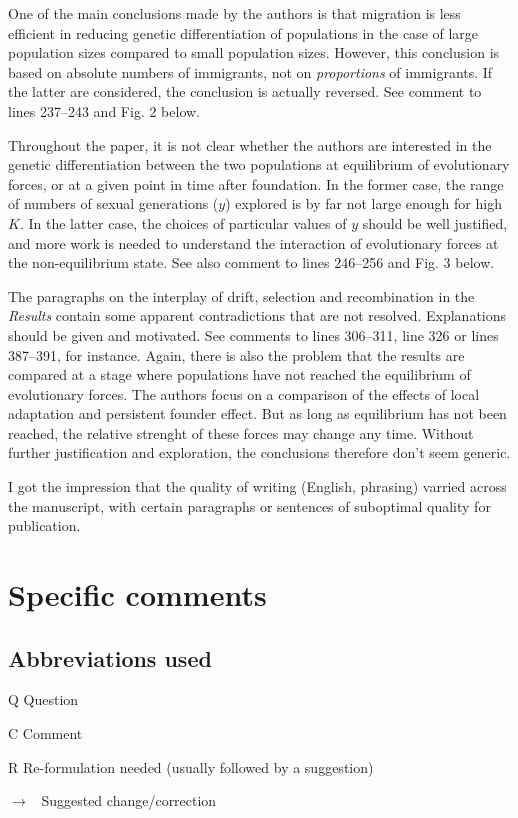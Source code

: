 \documentclass[11pt]{article}
\newenvironment{my_description}
{\begin{description}
  \setlength{\itemsep}{2pt}
  \setlength{\parskip}{0pt}
  \setlength{\parsep}{0pt}}
{\end{description}}
\newenvironment{my_enumerate}
{\begin{enumerate}
  \setlength{\itemsep}{2pt}
  \setlength{\parskip}{0pt}
  \setlength{\parsep}{0pt}}
{\end{enumerate}}
\newcommand{\ra}{$\rightarrow$\ }
\begin{document}
\begin{my_enumerate}
	\item One of the main conclusions made by the authors is that migration is less efficient in reducing genetic differentiation of populations in the case of large population sizes compared to small population sizes. However, this conclusion is based on absolute numbers of immigrants, not on \emph{proportions} of immigrants. If the latter are considered, the conclusion is actually reversed. See comment to lines 237--243 and Fig. 2 below.
	\item Throughout the paper, it is not clear whether the authors are interested in the genetic differentiation between the two populations at equilibrium of evolutionary forces, or at a given point in time after foundation. In the former case, the range of numbers of sexual generations ($y$) explored is by far not large enough for high $K$. In the latter case, the choices of particular values of $y$ should be well justified, and more work is needed to understand the interaction of evolutionary forces at the non-equilibrium state. See also comment to lines 246--256 and Fig. 3 below.
	\item The paragraphs on the interplay of drift, selection and recombination in the \emph{Results} contain some apparent contradictions that are not resolved. Explanations should be given and motivated. See comments to lines 306--311, line 326 or lines 387--391, for instance. Again, there is also the problem that the results are compared at a stage where populations have not reached the equilibrium of evolutionary forces. The authors focus on a comparison of the effects of local adaptation and persistent founder effect. But as long as equilibrium has not been reached, the relative strenght of these forces may change any time. Without further justification and exploration, the conclusions therefore don't seem generic.
	\item I got the impression that the quality of writing (English, phrasing) varried across the manuscript, with certain paragraphs or sentences of suboptimal quality for publication.
\end{my_enumerate}

\section{Specific comments}

\subsection{Abbreviations used}
\begin{my_description}
	\item[Q] Question
	\item[C] Comment
	\item[R] Re-formulation needed (usually followed by a suggestion)
	\item[\ra] Suggested change/correction
\end{my_description}
\end{document}
